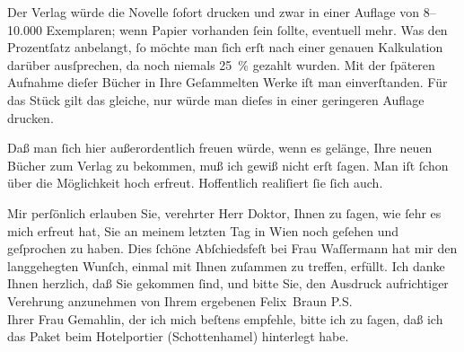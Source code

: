 \pstart
           Der Verlag würde die Novelle ſofort drucken und zwar
               in einer Auflage von 8–10.000 Exemplaren; wenn Papier vorhanden ſein ſollte,
               eventuell mehr. Was den Prozentſatz anbelangt, ſo möchte man ſich erſt nach einer
               genauen Kalkulation darüber ausſprechen, da noch niemals 25 {\%}
               gezahlt wurden. Mit der ſpäteren Aufnahme dieſer Bücher in Ihre Geſammelten Werke iſt man einverſtanden. Für das Stück gilt das gleiche, nur
               würde man dieſes in einer geringeren Auflage drucken.\pend
           
\pstart
           Daß man ſich hier außerordentlich freuen würde, wenn es gelänge, Ihre neuen Bücher
               zum Verlag zu bekommen, muß ich
               gewiß nicht erſt ſagen. Man iſt ſchon über die Möglichkeit hoch erfreut. Hoffentlich
               realiſiert ſie ſich auch.\pend
           
\pstart
           {\pb}Mir perſönlich erlauben Sie, verehrter Herr Doktor,
               Ihnen zu ſagen, wie ſehr es mich erfreut hat, Sie an meinem letzten Tag in Wien noch geſehen und geſprochen zu haben. Dies
               ſchöne Abſchiedsfeſt bei Frau Waſſermann hat
               mir den langgehegten Wunſch, einmal mit Ihnen zuſammen zu treffen, erfüllt. Ich danke
               Ihnen herzlich, daß Sie gekommen ſind, und bitte Sie, den Ausdruck aufrichtiger
               Verehrung anzunehmen von Ihrem ergebenen\pend
           \pstart \spacefill\mbox{Felix Braun}\pend{}
\pstart
           \noindent{}P.S.{\\}Ihrer Frau
                     Gemahlin, der ich mich beſtens empfehle, bitte ich zu ſagen, daß ich das
                  Paket beim Hotelportier (Schottenhamel)
                  hinterlegt habe.\pend
           \endnumbering{}  
      